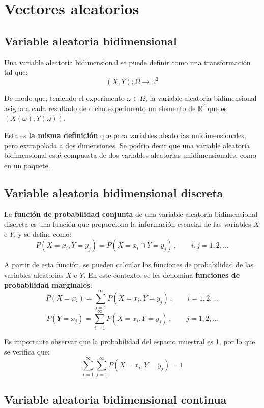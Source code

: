 \documentclass[a4paper]{book}
\begin{document}
\chapter{Vectores aleatorios}
\section{Variable aleatoria bidimensional}

Una variable aleatoria bidimensional se puede definir como una transformación tal que:
\[\left( X,Y \right) : \Omega \longrightarrow \mathbb{R}^2\]

De modo que, teniendo el experimento $\omega \in \Omega$, la variable aleatoria bidimensional asigna a cada resultado de dicho experimento un elemento de $\mathbb{R}^2$ que es $\left( X(\omega ),Y(\omega )\right)$.

Esta es \textbf{la misma definición} que para variables aleatorias unidimensionales, pero extrapolada a dos dimensiones. Se podría decir que una variable aleatoria bidimensional está compuesta de dos variables aleatorias unidimensionales, como en un paquete.

\section{Variable aleatoria bidimensional discreta}

La \textbf{función de probabilidad conjunta} de una variable aleatoria bidimensional discreta es una función que proporciona la información esencial de las variables $X$ e $Y$, y se define como:
\[P\left( X=x_i,Y=y_j \right) = P\left( X=x_i \cap Y=y_j \right) \, , \qquad i, j = 1, 2, \dots \] 

A partir de esta función, se pueden calcular las funciones de probabilidad de las variables aleatorias $X$ e $Y$. En este contexto, se les denomina \textbf{funciones de probabilidad marginales}:
\[ P\left( X=x_i \right) = \sum_{j=1}^{\infty} P\left( X=x_i, Y=y_j \right) \, , \qquad i = 1, 2, \dots \]
\[ P\left( Y=x_j \right) = \sum_{i=1}^{\infty} P\left( X=x_i, Y=y_j \right) \, , \qquad j = 1, 2, \dots \]

Es importante observar que la probabilidad del espacio muestral es 1, por lo que se verifica que:
\[ \sum_{i=1}^{\infty}\sum_{j=1}^{\infty} P\left( X=x_i, Y=y_j \right) = 1 \]

\section{Variable aleatoria bidimensional continua}
\end{document}
